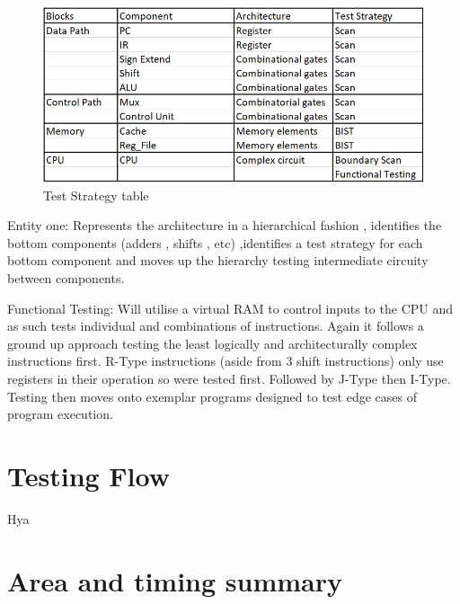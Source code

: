 \documentclass[10pt]{datasheet}
\begin{document}
\begin{figure}[h]
    \includegraphics[scale=0.7]{Assets/Strategy.PNG}
    \captionsetup{justification=centering}
    \caption{Test Strategy table}
\end{figure}

\smallbreak


Entity one: Represents the architecture in a hierarchical fashion , identifies the bottom components (adders , shifts , etc) ,identifies a test strategy for each bottom component and moves up the hierarchy testing intermediate circuity between components.
\smallbreak


\smallbreak

\vfill\break

Functional Testing: Will utilise a virtual RAM to control inputs to the CPU and as such tests individual and combinations of instructions. Again it follows a ground up approach testing the least logically and architecturally complex instructions first. R-Type instructions (aside from 3 shift instructions) only use registers in their operation so were tested first. Followed by J-Type then I-Type. Testing then moves onto exemplar programs designed to test edge cases of program execution. 
\smallbreak



\section{Testing Flow}
Hya


\onecolumn

\section{Area and timing summary}
\smallbreak
\end{document}
